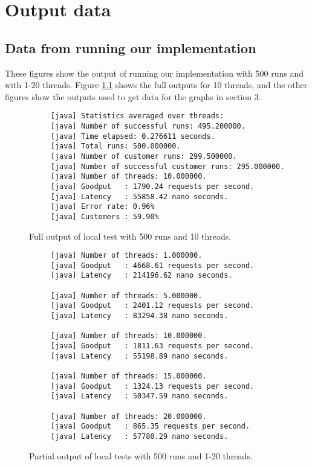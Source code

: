 \chapter{Output data}
\label{app:output}
\section{Data from running our implementation}
These figures show the output of running our implementation with 500 runs and with 1-20 threads. Figure \ref{stats} shows the full outputs for 10 threads, and the other figures show the outputs used to get data for the graphs in section 3.

\begin{figure}[h!]
\begin{verbatim}
     [java] Statistics averaged over threads:
     [java] Number of successful runs: 495.200000.
     [java] Time elapsed: 0.276611 seconds.
     [java] Total runs: 500.000000.
     [java] Number of customer runs: 299.500000.
     [java] Number of successful customer runs: 295.000000.
     [java] Number of threads: 10.000000.
     [java] Goodput   : 1790.24 requests per second.
     [java] Latency   : 55858.42 nano seconds.
     [java] Error rate: 0.96%
     [java] Customers : 59.90%
\end{verbatim}
\caption{Full output of local test with 500 runs and 10 threads.\label{stats}}
\end{figure}

\begin{figure}[h!]
\begin{verbatim}
     [java] Number of threads: 1.000000.
     [java] Goodput   : 4668.61 requests per second.
     [java] Latency   : 214196.62 nano seconds.

     [java] Number of threads: 5.000000.
     [java] Goodput   : 2401.12 requests per second.
     [java] Latency   : 83294.38 nano seconds.

     [java] Number of threads: 10.000000.
     [java] Goodput   : 1811.63 requests per second.
     [java] Latency   : 55198.89 nano seconds.

     [java] Number of threads: 15.000000.
     [java] Goodput   : 1324.13 requests per second.
     [java] Latency   : 50347.59 nano seconds.

     [java] Number of threads: 20.000000.
     [java] Goodput   : 865.35 requests per second.
     [java] Latency   : 57780.29 nano seconds.
\end{verbatim}
\caption{Partial output of local tests with 500 runs and 1-20 threads.}
\end{figure}


